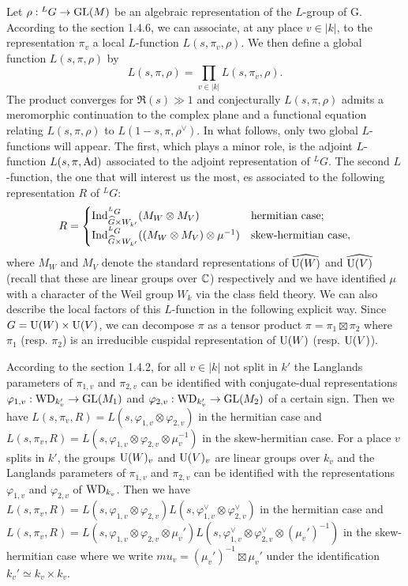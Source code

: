 Let $\rho: {}^L G \to \mathrm{GL}(M)$ be an algebraic representation of the $L$-group of G.
According to the section 1.4.6, we can associate, at any place $v \in |k|$, to the representation $\pi_v$ a local $L$-function $L(s, \pi_v, \rho)$.
We then define a global function $L(s, \pi, \rho)$ by
\[
    L(s, \pi, \rho) = \prod_{v \in |k|} L(s, \pi_v, \rho).
\]
The product converges for $\Re(s) \gg 1$ and conjecturally $L(s, \pi, \rho)$ admits a meromorphic continuation to the complex plane and a functional equation relating $L(s, \pi, \rho)$ to $L(1 - s, \pi, \rho^\vee)$.
In what follows, only two global $L$-functions will appear.
The first, which plays a minor role, is the adjoint $L$-function $L(s, \pi, \mathrm{Ad})$ associated to the adjoint representation of ${}^L G$.
The second $L$-function, the one that will interest us the most, es associated to the following representation $R$ of ${}^L G$:
\[
    R = \begin{cases} \mathrm{Ind}_{\widehat{G} \times W_{k'}}^{{}^L G}(M_W \otimes M_V) & \text{hermitian case}; \\
        \mathrm{Ind}_{\widehat{G} \times W_{k'}}^{{}^L G} ((M_W \otimes M_V) \otimes \mu^{-1}) & \text{skew-hermitian case},
    \end{cases}
\]
where $M_W$ and $M_V$ denote the standard representations of $\widehat{\mathrm{U}(W)}$ and $\widehat{\mathrm{U}(V)}$ (recall that these are linear groups over $\mathbb{C}$) respectively and we have identified $\mu$ with a character of the Weil group $W_k$ via the class field theory.
We can also describe the local factors of this $L$-function in the following explicit way.
Since $G = \mathrm{U}(W) \times \mathrm{U}(V)$, we can decompose $\pi$ as a tensor product $\pi = \pi_1 \boxtimes \pi_2$ where $\pi_1$ (resp. $\pi_2$) is an irreducible cuspidal representation of $\mathrm{U}(W)$ (resp. $\mathrm{U}(V)$).

According to the section 1.4.2, for all $v \in |k|$ not split in $k'$ the Langlands parameters of $\pi_{1, v}$ and $\pi_{2, v}$ can be identified with conjugate-dual representations $\varphi_{1, v}: \mathrm{WD}_{k_v'} \to \mathrm{GL}(M_1)$ and $\varphi_{2, v}: \mathrm{WD}_{k_v'} \to \mathrm{GL}(M_2)$ of a certain sign.
Then we have $L(s, \pi_v, R) = L(s, \varphi_{1, v} \otimes \varphi_{2, v})$ in the hermitian case and $L(s, \pi_v, R) = L(s, \varphi_{1, v} \otimes \varphi_{2, v} \otimes \mu_v^{-1})$ in the skew-hermitian case.
For a place $v$ splits in $k'$, the groups $\mathrm{U}(W)_v$ and $\mathrm{U}(V)_v$ are linear groups over $k_v$ and the Langlands parameters of $\pi_{1, v}$ and $\pi_{2, v}$ can be identified with the representations $\varphi_{1, v}$ and $\varphi_{2, v}$ of $\mathrm{WD}_{k_v}$.
Then we have $L(s, \pi_v, R) = L(s, \varphi_{1, v} \otimes \varphi_{2, v}) L(s, \varphi_{1, v}^\vee \otimes \varphi_{2, v}^\vee)$ in the hermitian case and $L(s, \pi_v, R) = L(s, \varphi_{1, v} \otimes \varphi_{2, v} \otimes \mu_{v}') L(s, \varphi_{1, v}^\vee \otimes \varphi_{2, v}^\vee \otimes (\mu_v')^{-1})$ in the skew-hermitian case where we write $mu_v = (\mu_v')^{-1} \boxtimes \mu_v'$ under the identification $k_v' \simeq k_v \times k_v$.

